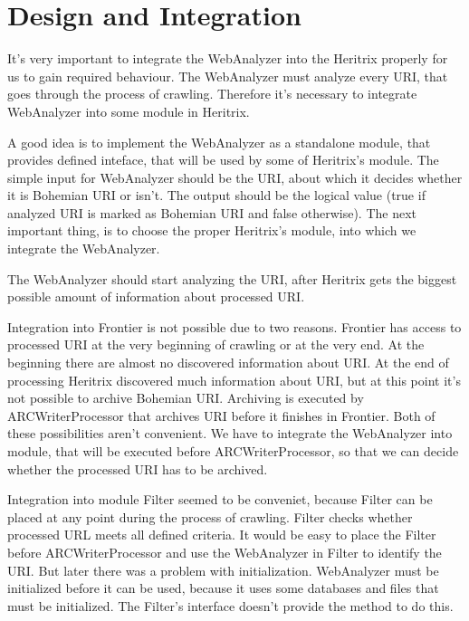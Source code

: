 \documentclass[11pt,a4paper]{article}
\begin{document}

\newpage
\section{Design and Integration}

It's very important to integrate the WebAnalyzer into the Heritrix properly for us to gain required behaviour. The WebAnalyzer must analyze every URI, that goes through the process of crawling. Therefore it's necessary to integrate WebAnalyzer into some module in Heritrix. 

A good idea is to implement the WebAnalyzer as a standalone module, that provides defined inteface, that will be used by some of Heritrix's module. The simple input for WebAnalyzer should be the URI, about which it decides whether it is Bohemian URI or isn't. The output should be the logical value (true if analyzed URI is marked as Bohemian URI and false otherwise). The next important thing, is to choose the proper Heritrix's module, into which we integrate the WebAnalyzer.

The WebAnalyzer should start analyzing the URI, after Heritrix gets the biggest possible amount of information about processed URI.

Integration into Frontier is not possible due to two reasons. Frontier has access to processed URI at the very beginning of crawling or at the very end. At the beginning there are almost no discovered information about URI. At the end of processing Heritrix discovered much information about URI, but at this point it's not possible to archive Bohemian URI. Archiving is executed by ARCWriterProcessor that archives URI before it finishes in Frontier. Both of these possibilities aren't convenient. We have to integrate the WebAnalyzer into module, that will be executed before ARCWriterProcessor, so that we can decide whether the processed URI has to be archived.

Integration into module Filter seemed to be conveniet, because Filter can be placed at any point during the process of crawling. Filter checks whether processed URL meets all defined criteria. It would be easy to place the Filter before ARCWriterProcessor and use the WebAnalyzer in Filter to identify the URI. But later there was a problem with initialization. WebAnalyzer must be initialized before it can be used, because it uses some databases and files that must be initialized. The Filter's interface doesn't provide the method to do this.
\end{document}
